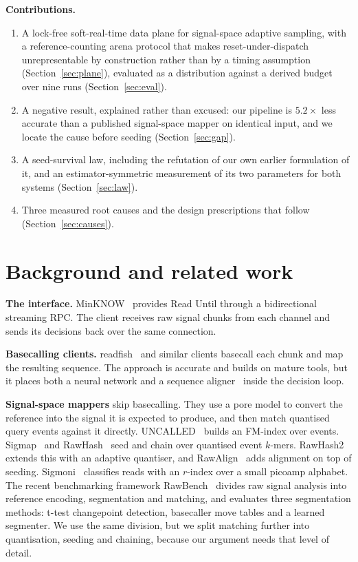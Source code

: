 \documentclass[runningheads]{llncs}
\begin{document}
\textbf{Contributions.}
\begin{enumerate}
\item A lock-free soft-real-time data plane for signal-space adaptive sampling, with a
reference-counting arena protocol that makes reset-under-dispatch unrepresentable by
construction rather than by a timing assumption (Section~\ref{sec:plane}), evaluated as a
distribution against a derived budget over nine runs (Section~\ref{sec:eval}).
\item A negative result, explained rather than excused: our pipeline is $5.2\times$ less accurate
than a published signal-space mapper on identical input, and we locate the cause before
seeding (Section~\ref{sec:gap}).
\item A seed-survival law, including the refutation of our own earlier formulation of it, and
an estimator-symmetric measurement of its two parameters for both systems
(Section~\ref{sec:law}).
\item Three measured root causes and the design prescriptions that follow
(Section~\ref{sec:causes}).
\end{enumerate}

\section{Background and related work}

\textbf{The interface.} MinKNOW~\cite{minknow} provides Read Until through a bidirectional
streaming RPC. The client receives raw signal chunks from each channel and sends its decisions
back over the same connection.

\textbf{Basecalling clients.} readfish~\cite{readfish} and similar clients basecall each chunk
and map the resulting sequence. The approach is accurate and builds on mature tools, but it
places both a neural network and a sequence aligner~\cite{minimap2} inside the decision loop.

\textbf{Signal-space mappers} skip basecalling. They use a pore model to convert the reference
into the signal it is expected to produce, and then match quantised query events against it
directly. UNCALLED~\cite{uncalled} builds an FM-index over events. Sigmap~\cite{sigmap} and
RawHash~\cite{rawhash} seed and chain over quantised event $k$-mers. RawHash2~\cite{rawhash2}
extends this with an adaptive quantiser, and RawAlign~\cite{rawalign} adds alignment on top of
seeding. Sigmoni~\cite{sigmoni} classifies reads with an $r$-index over a small picoamp
alphabet. The recent benchmarking framework RawBench~\cite{rawbench} divides raw signal
analysis into reference encoding, segmentation and matching, and evaluates three segmentation
methods: t-test changepoint detection, basecaller move tables and a learned segmenter. We use
the same division, but we split matching further into quantisation, seeding and chaining,
because our argument needs that level of detail.
\end{document}
